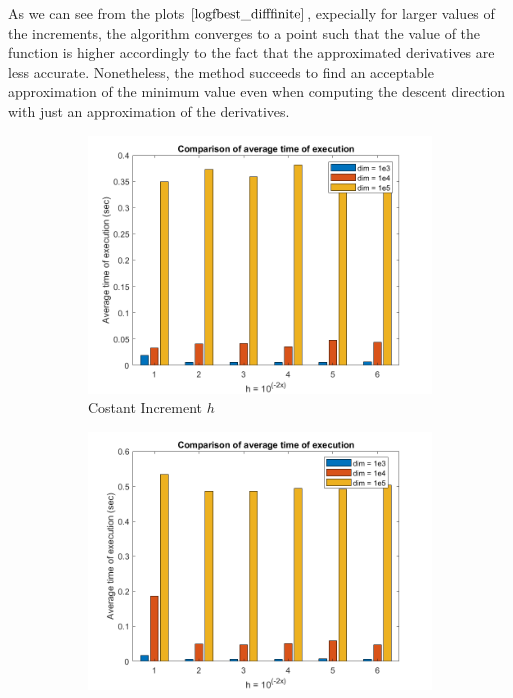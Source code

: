 As we can see from the plots $\eqref{logfbest_difffinite}$, expecially for larger values of the increments, the algorithm converges to a point such that the value of the function is higher accordingly to the fact that the approximated derivatives are less accurate. Nonetheless, the method succeeds to find an acceptable approximation of the minimum value even when computing the descent direction with just an approximation of the derivatives.

\begin{figure}[htbp]
    \centering
    \begin{subfigure}[t]{0.45\textwidth}  %
        \centering
        \includegraphics[width=\textwidth]{img/pb76_MN_difffinite_COST_timeofexec.png}
        \caption{Costant Increment $h$}
    \end{subfigure}
    \hspace{1cm} %
    \begin{subfigure}[t]{0.45\textwidth}
        \centering
        \includegraphics[width=\textwidth]{img/pb76_MN_difffinite_REL_timeofexec.png}

\end{subfigure}
\end{figure}
